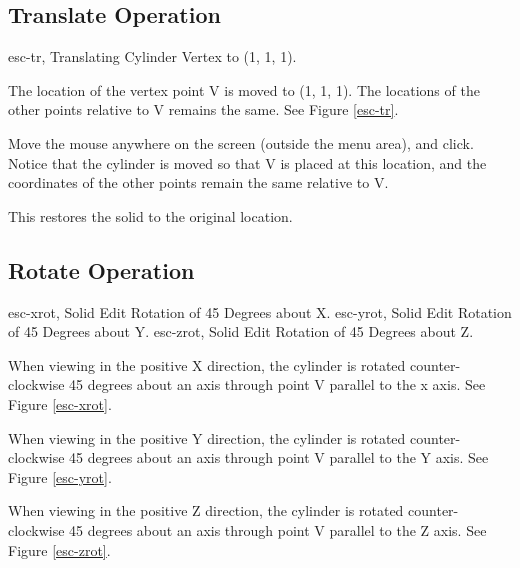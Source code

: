 \subsection{Translate Operation}
\mfig esc-tr, Translating Cylinder Vertex to (1, 1, 1).


The location of the vertex point V is moved to (1, 1, 1).
The locations of the other
points relative to V remains the same.  See Figure \ref{esc-tr}.

Move the mouse anywhere on the screen (outside the menu area), and click.
Notice
that the cylinder is moved so that V is placed at this location, and the
coordinates of the other points remain the same relative to V.


This restores the solid to the original location.

\subsection{Rotate Operation}
\mfig esc-xrot, Solid Edit Rotation of 45 Degrees about X.
\mfig esc-yrot, Solid Edit Rotation of 45 Degrees about Y.
\mfig esc-zrot, Solid Edit Rotation of 45 Degrees about Z.


When viewing in the positive X direction, the cylinder is rotated counter-
clockwise 45 degrees about an axis through point V parallel to the x axis.
See Figure \ref{esc-xrot}.


When viewing in the positive Y direction, the cylinder is rotated counter-
clockwise 45 degrees about an axis through point V parallel to the Y axis.
See Figure \ref{esc-yrot}.


When viewing in the positive Z direction, the cylinder is rotated counter-
clockwise 45 degrees about an axis through point V parallel to the Z axis.
See Figure \ref{esc-zrot}.

